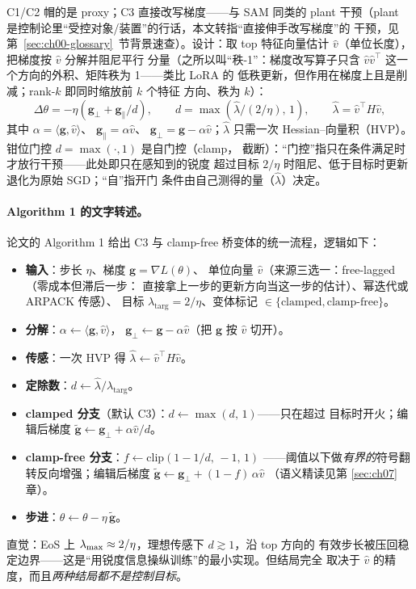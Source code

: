 C1/C2 帽的是 proxy；C3 直接改写梯度——与 SAM 同类的 plant 干预（plant
是控制论里“受控对象/装置”的行话，本文转指“直接伸手改写梯度”的
干预，见第~\ref{sec:ch00-glossary}~节背景速查）。设计：取
top 特征向量估计 $\hat v$（单位长度），把梯度按 $\hat v$ 分解并阻尼平行
分量（之所以叫“秩-1”：梯度改写算子只含
$\hat v\hat v^{\!\top}$ 这一个方向的外积、矩阵秩为 1——类比 LoRA 的
低秩更新，但作用在梯度上且是削减；rank-$k$ 即同时缩放前 $k$ 个特征
方向、秩为 $k$）：
\begin{equation}
  \Delta\theta=-\eta\left(\mathbf{g}_{\perp}+\mathbf{g}_{\parallel}/d\right),
  \qquad
  d=\max\!\left(\hat\lambda/(2/\eta),\,1\right),
  \qquad
  \hat\lambda=\hat v^{\!\top}\!H\hat v,
  \label{eq:ch05-rank1}
\end{equation}
其中 $\alpha=\langle\mathbf{g},\hat v\rangle$、
$\mathbf{g}_{\parallel}=\alpha\hat v$、
$\mathbf{g}_{\perp}=\mathbf{g}-\alpha\hat v$；$\hat\lambda$ 只需一次
Hessian--向量积（HVP）。钳位门控 $d=\max(\cdot,1)$ 是自门控（clamp，
截断）：“门控”指只在条件满足时才放行干预——此处即只在感知到的锐度
超过目标 $2/\eta$ 时阻尼、低于目标时更新退化为原始 SGD；“自”指开门
条件由自己测得的量（$\hat\lambda$）决定。

\paragraph{Algorithm 1 的文字转述。}
论文的 Algorithm 1 给出 C3 与 clamp-free 桥变体的统一流程，逻辑如下：
\begin{itemize}
  \item \textbf{输入}：步长 $\eta$、梯度 $\mathbf{g}=\nabla L(\theta)$、
        单位向量 $\hat v$（来源三选一：free-lagged（零成本但滞后一步：
        直接拿上一步的更新方向当这一步的估计）、幂迭代或 ARPACK 传感）、
        目标 $\lambda_{\mathrm{targ}}=2/\eta$、变体标记
        $\in\{\text{clamped},\text{clamp-free}\}$。
  \item \textbf{分解}：$\alpha\gets\langle\mathbf{g},\hat v\rangle$，
        $\mathbf{g}_{\perp}\gets\mathbf{g}-\alpha\hat v$（把 $\mathbf{g}$
        按 $\hat v$ 切开）。
  \item \textbf{传感}：一次 HVP 得 $\hat\lambda\gets\hat v^{\!\top}H\hat v$。
  \item \textbf{定除数}：$d\gets\hat\lambda/\lambda_{\mathrm{targ}}$。
  \item \textbf{clamped 分支}（默认 C3）：$d\gets\max(d,\,1)$——只在超过
        目标时开火；编辑后梯度
        $\tilde{\mathbf{g}}\gets\mathbf{g}_{\perp}+\alpha\hat v/d$。
  \item \textbf{clamp-free 分支}：$f\gets\mathrm{clip}(1-1/d,\,-1,\,1)$
        ——阈值以下做\emph{有界的}符号翻转反向增强；编辑后梯度
        $\tilde{\mathbf{g}}\gets\mathbf{g}_{\perp}+(1-f)\,\alpha\hat v$
        （语义精读见第 \ref{sec:ch07} 章）。
  \item \textbf{步进}：$\theta\gets\theta-\eta\,\tilde{\mathbf{g}}$。
\end{itemize}
直觉：EoS 上 $\lambda_{\max}\approx2/\eta$，理想传感下 $d\gtrsim1$，沿 top 方向的
有效步长被压回稳定边界——这是``用锐度信息操纵训练''的最小实现。但结局完全
取决于 $\hat v$ 的精度，而且\emph{两种结局都不是控制目标}。

